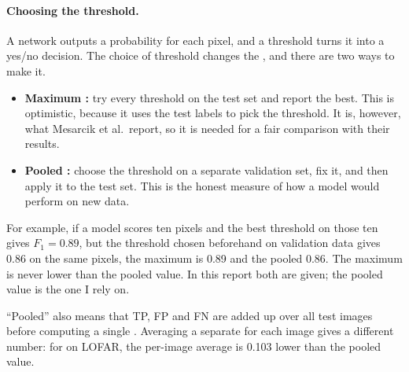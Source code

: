 \paragraph{Choosing the threshold.} A network outputs a probability for each
pixel, and a threshold turns it into a yes/no decision. The choice of threshold
changes the \Fone{}, and there are two ways to make it.
\begin{itemize}
  \item \textbf{Maximum \Fone{}:} try every threshold on the test set and report
    the best. This is optimistic, because it uses the test labels to pick the
    threshold. It is, however, what Mesarcik et al.\ report, so it is needed
    for a fair comparison with their results.
  \item \textbf{Pooled \Fone{}:} choose the threshold on a separate validation
    set, fix it, and then apply it to the test set. This is the honest
    measure of how a model would perform on new data.
\end{itemize}
For example, if a model scores ten pixels and the best threshold on those ten
gives $F_1 = 0.89$, but the threshold chosen beforehand on validation data
gives $0.86$ on the same pixels, the maximum \Fone{} is 0.89 and the pooled
\Fone{} 0.86. The maximum is never lower than the pooled value. In this report
both are given; the pooled value is the one I rely on.

``Pooled'' also means that TP, FP and FN are added up over all test images
before computing a single \Fone{}. Averaging a separate \Fone{} for each image
gives a different number: for \aoflagger{} on LOFAR, the per-image average is
0.103 lower than the pooled value.
